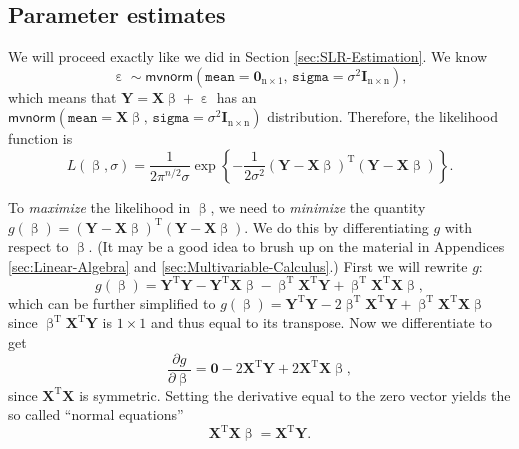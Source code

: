 \documentclass[captions=tableheading]{scrbook}
\begin{document}
\label{sec:Estimation-and-Prediction-MLR}
\subsection{Parameter estimates}
\label{sec-12-2-1}

\label{sub:mlr-parameter-estimates}

We will proceed exactly like we did in Section \ref{sec:SLR-Estimation}. We know
\begin{equation}
\upepsilon\sim\mathsf{mvnorm}\left(\mathtt{mean}=\mathbf{0}_{\mathrm{n}\times1},\,\mathtt{sigma}=\sigma^{2}\mathbf{I}_{\mathrm{n}\times\mathrm{n}}\right),
\end{equation}
which means that \(\mathbf{Y}=\mathbf{X}\upbeta+\upepsilon\) has an \(\mathsf{mvnorm}\left(\mathtt{mean}=\mathbf{X}\upbeta,\,\mathtt{sigma}=\sigma^{2}\mathbf{I}_{\mathrm{n}\times\mathrm{n}}\right)\) distribution. Therefore, the likelihood function is
\begin{equation}
L(\upbeta,\sigma)=\frac{1}{2\pi^{n/2}\sigma}\exp\left\{ -\frac{1}{2\sigma^{2}}\left(\mathbf{Y}-\mathbf{X}\upbeta\right)^{\mathrm{T}}\left(\mathbf{Y}-\mathbf{X}\upbeta\right)\right\}.
\end{equation}

To \emph{maximize} the likelihood in \(\upbeta\), we need to \emph{minimize} the quantity \(g(\upbeta)=\left(\mathbf{Y}-\mathbf{X}\upbeta\right)^{\mathrm{T}}\left(\mathbf{Y}-\mathbf{X}\upbeta\right)\). We do this by differentiating \(g\) with respect to \(\upbeta\). (It may be a good idea to brush up on the material in Appendices \ref{sec:Linear-Algebra} and \ref{sec:Multivariable-Calculus}.) First we will rewrite \(g\):
\begin{equation}
g(\upbeta)=\mathbf{Y}^{\mathrm{T}}\mathbf{Y}-\mathbf{Y}^{\mathrm{T}}\mathbf{X}\upbeta-\upbeta^{\mathrm{T}}\mathbf{X}^{\mathrm{T}}\mathbf{Y}+\upbeta^{\mathrm{T}}\mathbf{X}^{\mathrm{T}}\mathbf{X}\upbeta,
\end{equation}
which can be further simplified to \(g(\upbeta)=\mathbf{Y}^{\mathrm{T}}\mathbf{Y}-2\upbeta^{\mathrm{T}}\mathbf{X}^{\mathrm{T}}\mathbf{Y}+\upbeta^{\mathrm{T}}\mathbf{X}^{\mathrm{T}}\mathbf{X}\upbeta\) since \(\upbeta^{\mathrm{T}}\mathbf{X}^{\mathrm{T}}\mathbf{Y}\) is \(1\times1\) and thus equal to its transpose. Now we differentiate to get
\begin{equation}
\frac{\partial g}{\partial\upbeta}=\mathbf{0}-2\mathbf{X}^{\mathrm{T}}\mathbf{Y}+2\mathbf{X}^{\mathrm{T}}\mathbf{X}\upbeta,
\end{equation}
since \(\mathbf{X}^{\mathrm{T}}\mathbf{X}\) is symmetric. Setting the derivative equal to the zero vector yields the so called ``normal equations''
\begin{equation}
\mathbf{X}^{\mathrm{T}}\mathbf{X}\upbeta=\mathbf{X}^{\mathrm{T}}\mathbf{Y}.
\end{equation}
\end{document}
